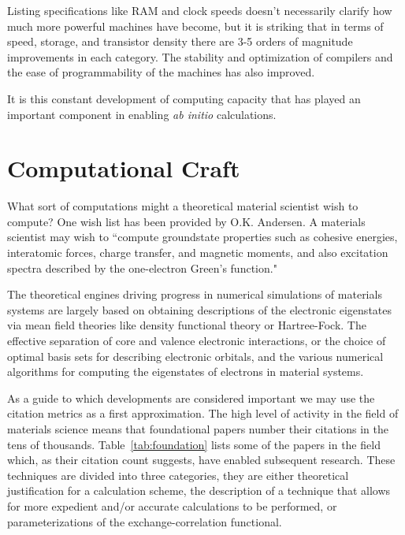 Listing specifications like RAM and clock speeds doesn't necessarily clarify 
how much more powerful machines have become, 
but it is striking that in terms of speed, storage, and transistor density 
there are 3-5 orders of magnitude improvements in each category. 
The stability and optimization of compilers and the ease of programmability
of the machines has also improved.

It is this constant development of computing capacity that 
has played an important component in enabling {\it ab initio} calculations. 

\section{Computational Craft}
What sort of computations might a theoretical material scientist
wish to compute? One wish list has been provided by O.K. Andersen. A materials scientist
may wish to ``compute groundstate properties such as cohesive energies, interatomic forces, 
charge transfer, and magnetic moments, and also excitation spectra described 
by the one-electron Green's function."\cite{anderson75} 

The theoretical engines driving progress in numerical simulations of materials systems are
largely based on obtaining descriptions of the electronic eigenstates via mean field theories
like density functional theory or Hartree-Fock. The effective separation
of core and valence electronic interactions, or the choice of optimal basis sets for
describing electronic orbitals, and the various numerical algorithms for 
computing the eigenstates of electrons in material systems.

As a guide to which developments are considered important we may
use the citation metrics as a first approximation. The high level of activity in the field of materials science 
means that foundational papers number their citations in the tens of thousands. 
Table~\ref{tab:foundation} lists some of the papers in the field which, as
their citation count suggests, have enabled subsequent research. These techniques are divided into
three categories, they are either theoretical justification for a calculation scheme, the description of
a technique that allows for more expedient and/or accurate calculations to be performed, 
or parameterizations of the exchange-correlation functional.

